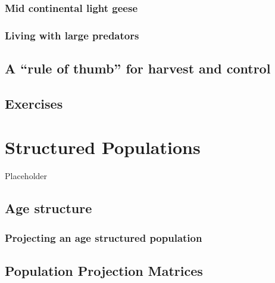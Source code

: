 \documentclass[]{book}
\theoremstyle{definition}
\theoremstyle{definition}
\theoremstyle{definition}
\theoremstyle{remark}
\begin{document}
\hypertarget{mid-continental-light-geese}{%
\subsection*{Mid continental light
geese}\label{mid-continental-light-geese}}

\hypertarget{living-with-large-predators}{%
\subsection*{Living with large
predators}\label{living-with-large-predators}}

\hypertarget{a-rule-of-thumb-for-harvest-and-control}{%
\section{A ``rule of thumb'' for harvest and
control}\label{a-rule-of-thumb-for-harvest-and-control}}

\hypertarget{exercises-3}{%
\section{Exercises}\label{exercises-3}}

\hypertarget{chap:structured}{%
\chapter{Structured Populations}\label{chap:structured}}

Placeholder

\hypertarget{age-structure}{%
\section{Age structure}\label{age-structure}}

\hypertarget{projecting-an-age-structured-population}{%
\subsection*{Projecting an age structured
population}\label{projecting-an-age-structured-population}}

\hypertarget{population-projection-matrices}{%
\section{Population Projection
Matrices}\label{population-projection-matrices}}
\end{document}
